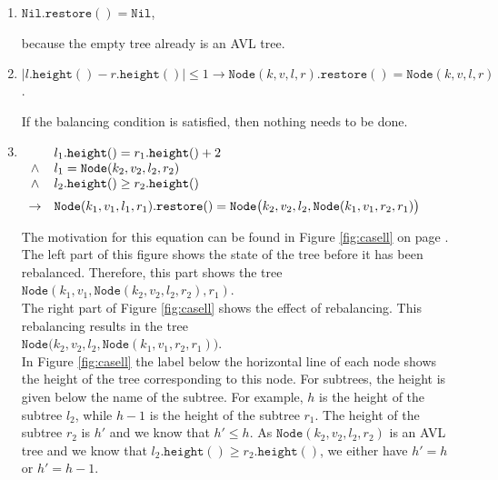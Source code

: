 \begin{enumerate}
\item $\texttt{Nil}.\texttt{restore}() = \texttt{Nil}$,

      because the empty tree already is an  AVL tree.
\item $|l.\texttt{height}() - r.\texttt{height}()| \leq 1 \rightarrow 
       \texttt{Node}(k,v,l,r).\texttt{restore}() = \texttt{Node}(k,v,l,r)$.

      If the balancing condition is satisfied, then nothing needs to be done. 
\item $\begin{array}[t]{cl}
              & l_1.\texttt{height}() = r_1.\texttt{height}() + 2    \\ 
       \wedge & l_1 = \texttt{Node}(k_2,v_2,l_2,r_2)                 \\
       \wedge & l_2.\texttt{height}() \geq r_2.\texttt{height}()     \\[0.2cm]
       \rightarrow & \texttt{Node}(k_1,v_1,l_1,r_1).\texttt{restore}() = 
                     \texttt{Node}\bigl(k_2,v_2,l_2,\texttt{Node}(k_1,v_1,r_2,r_1)\bigr)
       \end{array}
      $

      The motivation for this equation can be found in Figure \ref{fig:casell}
      on page \pageref{fig:casell}.  The left part of this figure shows the state
      of the tree before it has been rebalanced.  Therefore, this part shows the tree
      \\[0.2cm]
      \hspace*{1.3cm}
      $\texttt{Node}(k_1,v_1, \texttt{Node}(k_2,v_2,l_2,r_2), r_1)$. 
      \\[0.2cm]
      The right part of Figure \ref{fig:casell} shows the effect of rebalancing.  
      This rebalancing results in the tree
      \\[0.2cm]
      \hspace*{1.3cm}
      $\texttt{Node}\bigl(k_2,v_2,l_2,\texttt{Node}(k_1,v_1,r_2,r_1)\bigr)$.
      \\[0.2cm]
      In Figure \ref{fig:casell} the label below the horizontal line of each node shows the height
      of the tree corresponding to this node.  For subtrees, the height is given below the name of
      the subtree.  For example,  $h$ is the height of the subtree 
      $l_2$, while $h-1$ is the height of the subtree $r_1$. The height of the subtree $r_2$
      is $h'$ and we know that $h' \leq h$.  As $\texttt{Node}(k_2,v_2,l_2,r_2)$ is an AVL tree and we know that
      $l_2.\texttt{height}() \geq r_2.\texttt{height}()$, we
      either have $h' = h$ or $h' = h-1$.


\end{enumerate}
